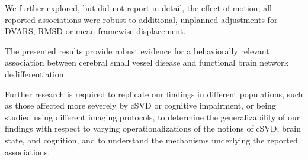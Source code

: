 We further explored, but did not report in detail, the effect of motion; all reported associations were robust to additional, unplanned adjustments for DVARS, RMSD or mean framewise displacement.

The presented results provide robust evidence for a behaviorally relevant association between cerebral small vessel disease and functional brain network dedifferentiation. 

Further research is required to replicate our findings in different populations, such as those affected more severely by cSVD or cognitive impairment, or being studied using different imaging protocols, to determine the generalizability of our findings with respect to varying operationalizations of the notions of cSVD, brain state, and cognition, and to understand the mechanisms underlying the reported associations.

